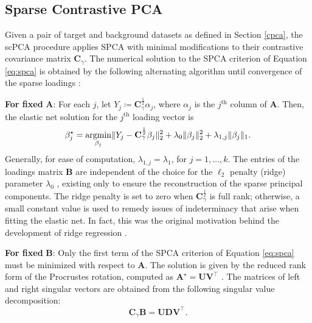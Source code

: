 \subsection{Sparse Contrastive PCA}

Given a pair of target and background datasets as defined in Section \ref{cpca},
the scPCA procedure applies SPCA with minimal modifications to their contrastive covariance matrix $\mathbf{C}_\gamma$. The numerical solution to the SPCA criterion of Equation
\eqref{eq:spca} is obtained by the following alternating algorithm
until convergence of the sparse loadings \cite{Zou2006}:

\textbf{For fixed} $\mathbf{A}$: For each $j$, let
$Y_j \coloneqq \mathbf{C}_\gamma^{\frac{1}{2}}\alpha_j$, where $\alpha_j$ is
the $j^{\text{th}}$ column of $\mathbf{A}$. Then, the elastic net solution for
the $j^{\text{th}}$ loading vector is
\begin{equation*}
  \beta_j^\star = \operatorname*{argmin}_{\beta_j} \lVert Y_j - \mathbf{C}_\gamma^{\frac{1}{2}}
  \beta_j \rVert_2^2 + \lambda_0 \lVert \beta_j \rVert_2^2 + \lambda_{1, j}
  \lVert \beta_j \rVert_1.
\end{equation*}
Generally, for ease of computation, $\lambda_{1, j} = \lambda_1$, for
$j=1, \ldots, k$. The entries of the loadings matrix $\mathbf{B}$ are independent of
the choice for the $\ell_2$ penalty (ridge) parameter $\lambda_0$
\cite{Zou2006}, existing only to ensure the reconstruction of the sparse
principal components. The ridge penalty is set to zero when
$\mathbf{C}^{\frac{1}{2}}_\gamma$ is full rank; otherwise, a small constant
value is used to remedy issues of indeterminacy that arise when fitting the
elastic net. In fact, this was the original motivation
behind the development of ridge regression \cite{Hoerl1970}.

\textbf{For fixed} $\mathbf{B}$: Only the first term of the SPCA criterion of
Equation \eqref{eq:spca} must be minimized with respect to $\mathbf{A}$. The
solution is given by the reduced rank form of the Procrustes rotation, computed
as $\mathbf{A}^\star = \mathbf{U}\mathbf{V}^\top$ \cite{Zou2006}. The matrices
of left and right singular vectors are obtained from the following singular
value decomposition:
\begin{equation*}
  \mathbf{C}_\gamma\mathbf{B} = \mathbf{U}\mathbf{D}\mathbf{V}^\top.
\end{equation*}

